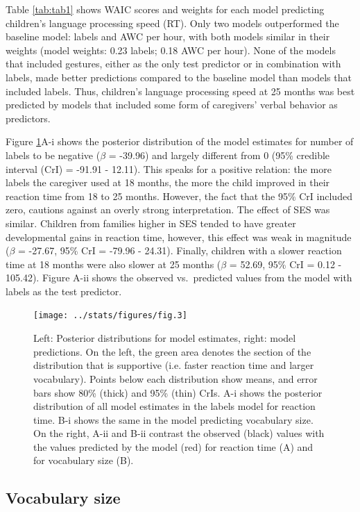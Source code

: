 \documentclass[
  man,floatsintext]{apa6}
\begin{document}
Table \ref{tab:tab1} shows WAIC scores and weights for each model predicting children's language processing speed (RT). Only two models outperformed the baseline model: labels and AWC per hour, with both models similar in their weights (model weights: 0.23 labels; 0.18 AWC per hour). None of the models that included gestures, either as the only test predictor or in combination with labels, made better predictions compared to the baseline model than models that included labels. Thus, children's language processing speed at 25 months was best predicted by models that included some form of caregivers' verbal behavior as predictors.

Figure \ref{fig:fig3}A-i shows the posterior distribution of the model estimates for number of labels to be negative (\(\beta\) = -39.96) and largely different from 0 (95\% credible interval (CrI) = -91.91 - 12.11). This speaks for a positive relation: the more labels the caregiver used at 18 months, the more the child improved in their reaction time from 18 to 25 months. However, the fact that the 95\% CrI included zero, cautions against an overly strong interpretation. The effect of SES was similar. Children from families higher in SES tended to have greater developmental gains in reaction time, however, this effect was weak in magnitude (\(\beta\) = -27.67, 95\% CrI = -79.96 - 24.31). Finally, children with a slower reaction time at 18 months were also slower at 25 months (\(\beta\) = 52.69, 95\% CrI = 0.12 - 105.42). Figure A-ii shows the observed vs.~predicted values from the model with labels as the test predictor.

\begin{figure}
\texttt{[image: ../stats/figures/fig.3]} \caption{Left: Posterior distributions for model estimates, right: model predictions. On the left, the green area denotes the section of the distribution that is supportive (i.e. faster reaction time and larger vocabulary). Points below each distribution show means, and error bars show 80\% (thick) and 95\% (thin) CrIs.  A-i shows the posterior distribution of all model estimates in the labels model for reaction time. B-i shows the same in the model predicting vocabulary size. On the right, A-ii and B-ii contrast the observed (black) values with the values predicted by the model (red) for reaction time (A) and for vocabulary size (B).}\label{fig:fig3}
\end{figure}

\hypertarget{vocabulary-size-1}{%
\subsection{Vocabulary size}\label{vocabulary-size-1}}
\end{document}
